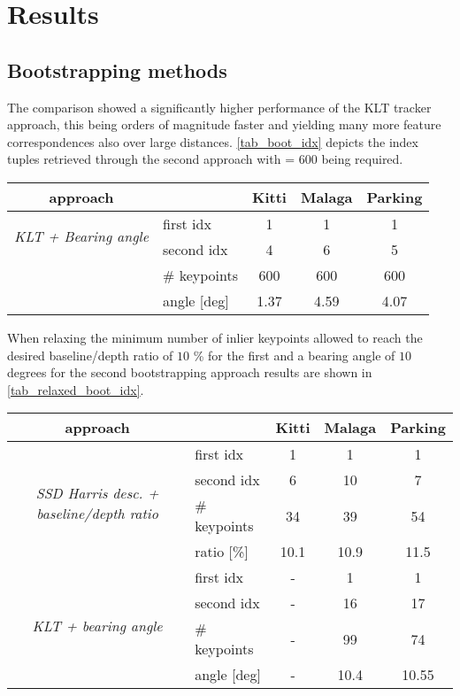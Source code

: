 \section{Results}
\label{sec_results}

\subsection{Bootstrapping methods}
\label{sec_boot_results}
The comparison showed a significantly higher performance of the KLT tracker approach, this being orders of magnitude faster and yielding many more feature correspondences also over large distances. \cref{tab_boot_idx} depicts the index tuples retrieved through the second approach with  = $600$ being required.
\begin{center}
	\begin{tabular}{ c | l | c  c  c }
		approach &				 &				Kitti &		Malaga &	Parking\\
  		\hline
 \multirow{2}{*}{\textit{KLT + Bearing angle}} &	first idx &	1 & 		1 & 		1\\
  		 & 						second idx &	4 & 		6 & 		5\\
  		& 						\# keypoints & 				600 & 		600 & 		600\\
  		&						angle [deg] & 				1.37 &			4.59 &			4.07\\
  		\hline
	\end{tabular}
	\label{tab_boot_idx}
\end{center}

When relaxing the minimum number of inlier keypoints allowed to reach the desired baseline/depth ratio of $10$ \% for the first and a bearing angle of $10$ degrees for the second bootstrapping approach results are shown in \cref{tab_relaxed_boot_idx}.
\begin{center}
	\begin{tabular}{ c | l | c  c  c }
		approach &				 &				Kitti &		Malaga &	Parking\\
  		\hline
 \multirow{4}{*}{\textit{SSD Harris desc. + baseline/depth ratio}} 
 		&						first idx &			1 & 		1 & 		1\\
  		& 						second idx &		6 & 		10 & 		7\\
  		& 						\# keypoints & 		34 & 		39 & 		54\\
  		&						ratio [\%] & 		10.1 &		10.9 &		11.5\\
  		\hline
  \multirow{4}{*}{\textit{KLT + bearing angle}} 
  		&						first idx &			- & 		1 & 		1\\
  		& 						second idx &		- & 		16 & 		17\\
  		& 						\# keypoints & 		- & 		99 & 		74\\
  		&						angle [deg] & 		- &			10.4 &		10.55\\
  		\hline
	\end{tabular}
	\label{tab_relaxed_boot_idx}
\end{center}

